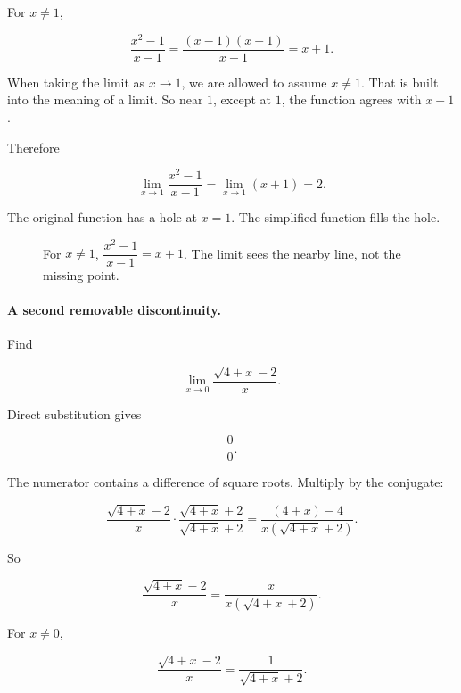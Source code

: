 For \(x\neq1\),

\[
\frac{x^2-1}{x-1}
=
\frac{(x-1)(x+1)}{x-1}
=
x+1.
\]

When taking the limit as \(x\to1\), we are allowed to assume \(x\neq1\).  That is built into the meaning of a limit.  So near \(1\), except at \(1\), the function agrees with \(x+1\).

Therefore

\[
\lim_{x\to1}\frac{x^2-1}{x-1}
=
\lim_{x\to1}(x+1)
=
2.
\]

The original function has a hole at \(x=1\).  The simplified function fills the hole.

\begin{figure}[h]
\centering
{}
\caption{For \(x\neq1\), \(\dfrac{x^2-1}{x-1}=x+1\).  The limit sees the nearby line, not the missing point.}
\label{fig:removable-hole}
\end{figure}

\paragraph{A second removable discontinuity.}
Find

\[
\lim_{x\to0}\frac{\sqrt{4+x}-2}{x}.
\]

Direct substitution gives

\[
\frac{0}{0}.
\]

The numerator contains a difference of square roots.  Multiply by the conjugate:

\[
\frac{\sqrt{4+x}-2}{x}
\cdot
\frac{\sqrt{4+x}+2}{\sqrt{4+x}+2}
=
\frac{(4+x)-4}{x(\sqrt{4+x}+2)}.
\]

So

\[
\frac{\sqrt{4+x}-2}{x}
=
\frac{x}{x(\sqrt{4+x}+2)}.
\]

For \(x\neq0\),

\[
\frac{\sqrt{4+x}-2}{x}
=
\frac{1}{\sqrt{4+x}+2}.
\]

